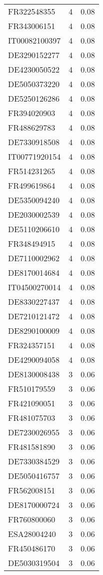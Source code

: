 \begin{table*}[htbp]
\begin{tabular}{lrr}
FR322548355 & 4 & 0.08 \\
FR343006151 & 4 & 0.08 \\
IT00082100397 & 4 & 0.08 \\
DE3290152277 & 4 & 0.08 \\
DE4230050522 & 4 & 0.08 \\
DE5050373220 & 4 & 0.08 \\
DE5250126286 & 4 & 0.08 \\
FR394020903 & 4 & 0.08 \\
FR488629783 & 4 & 0.08 \\
DE7330918508 & 4 & 0.08 \\
IT00771920154 & 4 & 0.08 \\
FR514231265 & 4 & 0.08 \\
FR499619864 & 4 & 0.08 \\
DE5350094240 & 4 & 0.08 \\
DE2030002539 & 4 & 0.08 \\
DE5110206610 & 4 & 0.08 \\
FR348494915 & 4 & 0.08 \\
DE7110002962 & 4 & 0.08 \\
DE8170014684 & 4 & 0.08 \\
IT04500270014 & 4 & 0.08 \\
DE8330227437 & 4 & 0.08 \\
DE7210121472 & 4 & 0.08 \\
DE8290100009 & 4 & 0.08 \\
FR324357151 & 4 & 0.08 \\
DE4290094058 & 4 & 0.08 \\
DE8130008438 & 3 & 0.06 \\
FR510179559 & 3 & 0.06 \\
FR421090051 & 3 & 0.06 \\
FR481075703 & 3 & 0.06 \\
DE7230026955 & 3 & 0.06 \\
FR481581890 & 3 & 0.06 \\
DE7330384529 & 3 & 0.06 \\
DE5050416757 & 3 & 0.06 \\
FR562008151 & 3 & 0.06 \\
DE8170000724 & 3 & 0.06 \\
FR760800060 & 3 & 0.06 \\
ESA28004240 & 3 & 0.06 \\
FR450486170 & 3 & 0.06 \\
DE5030319504 & 3 & 0.06 \\

\end{tabular}
\end{table*}
